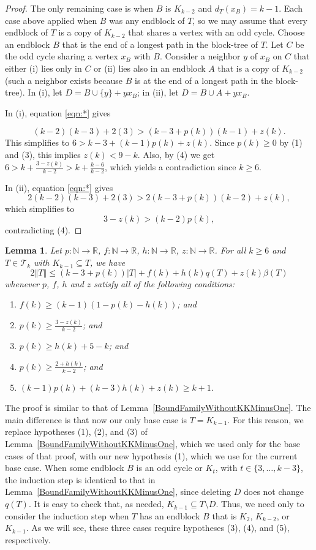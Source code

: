 \documentclass[10pt]{article}
\theoremstyle{plain}
\newtheorem{lem}[thm]{Lemma}
\theoremstyle{definition}
\theoremstyle{remark}
\newcommand{\fancy}[1]{\mathcal{#1}}
\newcommand{\IN}{\mathbb{N}}
\newcommand{\IR}{\mathbb{R}}
\newcommand{\T}{\fancy{T}}
\newcommand{\card}[1]{\left|#1\right|}
\newcommand{\size}[1]{\left\Vert#1\right\Vert}
\newcommand{\func}[3]{#1\colon #2 \rightarrow #3}
\begin{document}
\begin{proof}
The only remaining case is when $B$ is $K_{k-2}$ and $d_T(x_B) =
k - 1$.  Each case above applied when $B$ was any endblock of $T$, so we may
assume that every endblock of $T$ is a copy of $K_{k-2}$ that shares a vertex
with an odd cycle.  Choose an endblock $B$ that is the end of a longest path in
the block-tree of $T$.  Let $C$ be the odd cycle sharing a vertex $x_B$ with
$B$.  Consider a neighbor $y$ of $x_B$ on $C$ that either (i) lies only in $C$
or (ii) lies also in an endblock $A$ that is a copy of $K_{k-2}$ (such a
neighbor exists because $B$ is at the end of a longest path in the block-tree).
In (i), let $D=B\cup\{y\}+yx_B$; in (ii), let $D=B\cup A+yx_B$.

In (i), equation \eqref{eqn:*} gives

\[(k-2)(k-3)+2(3) > (k-3+p(k))(k-1) + z(k).\]
%
This simplifies to $6>k-3+(k-1)p(k) + z(k)$.  Since $p(k) \ge 0$ by (1) and (3), this implies $z(k) < 9-k$. Also, by (4) we get $6>k+\frac{3-z(k)}{k-2} > k + \frac{k-6}{k-2}$, which yields a contradiction since $k \ge 6$.

In (ii), equation \eqref{eqn:*} gives
	\[2(k-2)(k-3) + 2(3) > 2(k-3 + p(k))(k-2) + z(k),\]
	which simplifies to
	\[3 - z(k) > (k-2)p(k),\]
	contradicting (4).
\end{proof}

\begin{lem}\label{BoundFamilyWithKKMinusOne}
	Let $\func{p}{\IN}{\IR}$, $\func{f}{\IN}{\IR}$, $\func{h}{\IN}{\IR}$, $\func{z}{\IN}{\IR}$. 
	For all $k \ge 6$ and $T \in \T_k$ with $K_{k-1} \subseteq T$, we have
	\[2\size{T} \le (k-3 + p(k))\card{T} + f(k) + h(k)q(T) + z(k)\beta(T)\]
	whenever $p$, $f$, $h$ and $z$ satisfy all of the following conditions:
	\begin{enumerate}
		\item $f(k) \ge (k-1)(1- p(k) - h(k))$; and	
	    \item $p(k) \ge \frac{3 - z(k)}{k-2}$; and
		\item $p(k) \ge h(k) + 5 - k$; and
		\item $p(k) \ge \frac{2+h(k)}{k-2}$; and
		\item $(k-1)p(k) + (k-3)h(k) + z(k)\ge k+1$.
	\end{enumerate}
\end{lem}

The proof is similar to that of Lemma~\ref{BoundFamilyWithoutKKMinusOne}.  The
main difference is that now our only base case is $T=K_{k-1}$.  For this
reason, we replace hypotheses (1), (2), and (3) of
Lemma~\ref{BoundFamilyWithoutKKMinusOne}, which we used only for the base cases
of that proof, with our new hypothesis (1), which we use for the current base
case.  When some endblock $B$ is an odd cycle or $K_t$, with $t\in\{3, \ldots,
k-3\}$, the induction step is identical to that in
Lemma~\ref{BoundFamilyWithoutKKMinusOne}, since deleting $D$ does not change
$q(T)$.
It is easy to check that, as needed, $K_{k-1}\subseteq T\setminus D$.  Thus, we
need only to consider the induction step when $T$ has an endblock $B$ that is
$K_2$, $K_{k-2}$, or $K_{k-1}$.  As we will see, these three cases require
hypotheses (3), (4), and (5), respectively.
    
\end{document}
